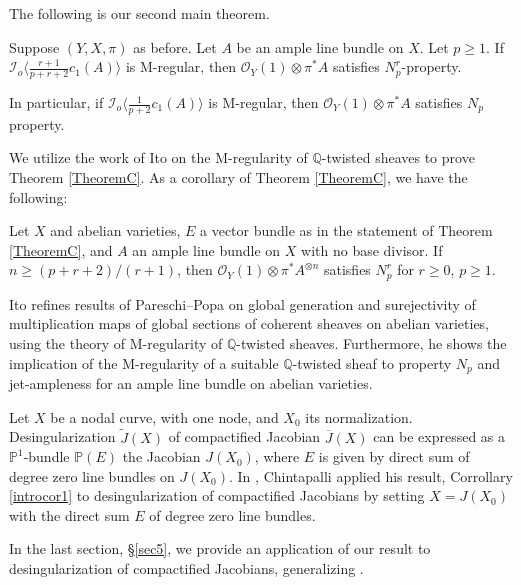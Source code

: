 \documentclass[11pt,letter]{amsart}
\numberwithin{equation}{section}
\begin{document}
  The following is our second main theorem.  
\begin{introthm}\label{TheoremC}
Suppose $(Y,X,\pi)$ as before. 
Let $A$ be an ample line bundle on $X$. Let $p\geq 1$.
 If $\mathcal{I}_o\langle \frac{r+1}{p+r+2}c_1(A)\rangle$ is M-regular, then $\mathcal{O}_Y(1)\otimes\pi^*A$ satisfies $N_p^r$-property.  
 
 In particular, if $\mathcal{I}_o\langle \frac{1}{p+2}c_1(A)\rangle$ is M-regular, then $\mathcal{O}_Y(1)\otimes\pi^*A$ satisfies $N_p$ property. 
\end{introthm}

We utilize the work of Ito \cite{Ito22} on the M-regularity of $\mathbb{Q}$-twisted sheaves to prove Theorem \ref{TheoremC}.
As a corollary of Theorem \ref{TheoremC}, we have the following:
\begin{introcor}\label{introcor2}
  Let $X$ and abelian varieties, $E$ a vector bundle as in the statement of Theorem \ref{TheoremC}, and $A$ an ample line bundle on $X$ with no base divisor. If $n\geq (p+r+2)/(r+1)$, then $\mathcal{O}_Y(1)\otimes\pi^* A^{\otimes n}$ satisfies $N_p^r$ for $r\geq 0$, $p\geq 1$.
  \end{introcor}
  
 Ito \cite{Ito22} refines results of Pareschi--Popa \cite{PP03,PP11} on global generation and surejectivity of multiplication maps of global sections of coherent sheaves on abelian varieties, using the theory of M-regularity of $\mathbb{Q}$-twisted sheaves. Furthermore, he shows the implication of the M-regularity of a suitable $\mathbb{Q}$-twisted sheaf to property $N_p$ and jet-ampleness for an ample line bundle on abelian varieties. 

  
  
 Let $X$ be a nodal curve, with one node, and $X_0$ its normalization. Desingularization $\widetilde{J}(X)$ of compactified Jacobian $\overline{J}(X)$ can be expressed as a $\mathbb{P}^1$-bundle $\mathbb{P}(E)$ the Jacobian $J(X_0)$, where $E$ is given by direct sum of degree zero line bundles on ${J}(X_0)$. In \cite[Theorem 5.4]{Chi19}, Chintapalli applied his result, Corrollary \ref{introcor1} to desingularization of compactified Jacobians by setting $X=J(X_0)$ with the direct sum $E$ of degree zero line bundles.
 
  In the last section, \S\ref{sec5}, we provide an application of our result to desingularization of compactified Jacobians, generalizing \cite[Theorem 5.4]{Chi19}. 
  
\end{document}
